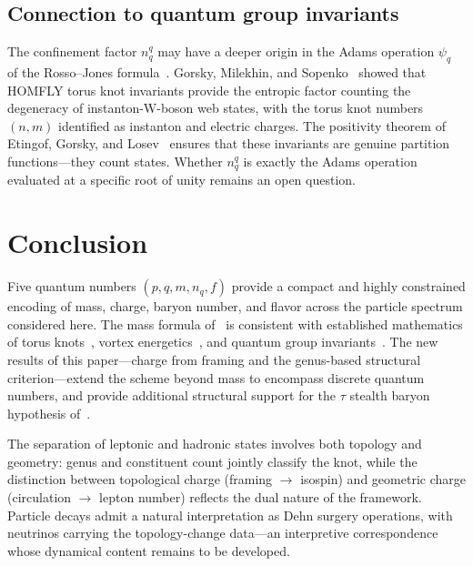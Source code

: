 \documentclass[11pt,a4paper]{article}
\begin{document}
\subsection{Connection to quantum group invariants}

The confinement factor $n_q^q$ may have a deeper origin in
the Adams operation $\psi_q$ of the Rosso--Jones
formula~\cite{RossoJones1993}.  Gorsky, Milekhin, and
Sopenko~\cite{Gorsky2015} showed that HOMFLY torus knot
invariants provide the entropic factor counting the degeneracy
of instanton-W-boson web states, with the torus knot numbers
$(n,m)$ identified as instanton and electric charges.  The
positivity theorem of Etingof, Gorsky, and
Losev~\cite{EtingofGorskyLosev2013} ensures that these
invariants are genuine partition functions---they count
states.  Whether $n_q^q$ is exactly the Adams operation
evaluated at a specific root of unity remains an open question.


\section{Conclusion}
\label{sec:conclusion}

Five quantum numbers $(p, q, m, n_q, f)$ provide a compact
and highly constrained encoding of mass, charge, baryon
number, and flavor across the particle spectrum considered
here.  The mass formula of~\cite{paper6} is consistent with
established mathematics of torus
knots~\cite{Sreedhar2015,BiswasGhosh2019}, vortex
energetics~\cite{Donnelly}, and quantum group
invariants~\cite{RossoJones1993}.  The new results of this
paper---charge from framing and the genus-based structural
criterion---extend the scheme beyond mass to encompass
discrete quantum numbers, and provide additional structural
support for the $\tau$ stealth baryon hypothesis of~\cite{paper6}.

The separation of leptonic and hadronic states involves both
topology and geometry: genus and constituent count jointly
classify the knot, while the distinction between topological
charge (framing $\to$ isospin) and geometric charge
(circulation $\to$ lepton number) reflects the dual nature
of the framework.  Particle decays admit a natural
interpretation as Dehn surgery operations, with neutrinos
carrying the topology-change data---an interpretive
correspondence whose dynamical content remains to be
developed.
\end{document}
